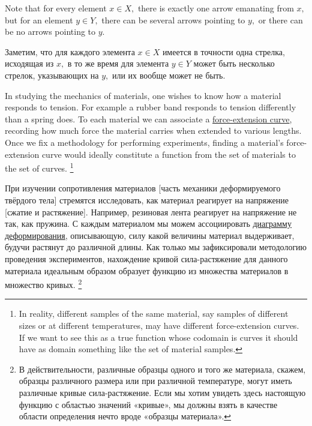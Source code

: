 \documentclass[CT4S-EN-RU]{subfiles}
\begin{document}
\begin{blockENG}
Note that for every element $x\in X,$ there is exactly one arrow emanating from $x,$ but for an element $y\in Y,$ there can be several arrows pointing to $y,$ or there can be no arrows pointing to $y.$ 
\end{blockENG}

\begin{blockRUS}
Заметим, что для каждого элемента $x\in X$ имеется в точности одна стрелка, исходящая из $x,$ в то же время для элемента $y\in Y$ может быть несколько стрелок, указывающих на $y,$ или их вообще может не быть.
\end{blockRUS}

\begin{applicationENG}\label{app:force-extension}
In studying the mechanics of materials, one wishes to know how a material responds to tension. For example a rubber band responds to tension differently than a spring does. To each material we can associate a \href{http://en.wikipedia.org/wiki/Stress–strain_curve}{\text force-extension curve}, recording how much force the material carries when extended to various lengths. Once we fix a methodology for performing experiments, finding a material's force-extension curve would ideally constitute a function from the set of materials to the set of curves.%
\footnote{In reality, different samples of the same material, say samples of different sizes or at different temperatures, may have different force-extension curves. If we want to see this as a true function whose codomain is curves it should have as domain something like the set of material samples.}
\end{applicationENG}

\begin{applicationRUS}\label{app:force-extension}
При изучении сопротивления материалов [часть механики деформируемого твёрдого тела] стремятся исследовать, как материал реагирует на напряжение [сжатие и растяжение]. Например, резиновая лента реагирует на напряжение не так, как пружина. С каждым материалом мы можем ассоциировать \href{https://ru.wikipedia.org/wiki/%D0%94%D0%B8%D0%B0%D0%B3%D1%80%D0%B0%D0%BC%D0%BC%D0%B0_%D0%B4%D0%B5%D1%84%D0%BE%D1%80%D0%BC%D0%B8%D1%80%D0%BE%D0%B2%D0%B0%D0%BD%D0%B8%D1%8F}{\text диаграмму деформирования}, описывающую, силу какой величины материал выдерживает, будучи растянут до различной длины. Как только мы зафиксировали методологию проведения экспериментов, нахождение кривой сила-растяжение для данного материала идеальным образом образует функцию из множества материалов в множество кривых.%
\footnote{В действительности, различные образцы одного и того же материала, скажем, образцы различного размера или при различной температуре, могут иметь различные кривые сила-растяжение. Если мы хотим увидеть здесь настоящую функцию с областью значений «кривые», мы должны взять в качестве области определения нечто вроде «образцы материала».} 
\end{applicationRUS}
\end{document}
